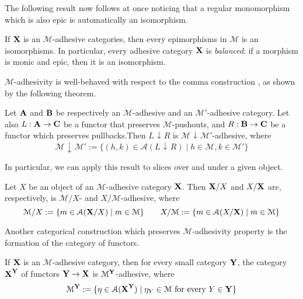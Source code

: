 \documentclass[a4paper,UKenglish,cleveref,pdftex, thm-restate,numberwithinsect]{lipics}
\def\A{\textbf {\textup{A}}}
\def\B{\textbf {\textup{B}}}
\def\C{\textbf {\textup{C}}}
\def\X{\textbf {\textup{X}}}
\def\Y{\textbf {\textup{Y}}}
\newcommand{\comma}[2]{#1\hspace{1pt} {\downarrow}\hspace{1pt} #2}
\newcommand{\cma}[2]{\mathcal{#1}\hspace{1pt} {\downarrow}\hspace{1pt} \mathcal{#2}}
\begin{document}
{The following result now follows at once noticing that a regular monomorphism which is also epic is automatically an isomorphism.

\begin{corollary}\label{prop:bal}
If $\X$ is an $\mathcal{M}$-adhesive categories, then every epimorphisms in $\mathcal{M}$ is an isomorphisms. In particular, every adhesive category $\X$ is \emph{balanced}: if a morphism is monic and epic, then it is an isomorphism.
\end{corollary}
}


$\mathcal{M}$-adhesivity is well-behaved with respect to  the comma construction \cite{mac2013categories}, as shown by the following theorem.
\begin{theorem}\label{lem:comma}
	Let $\A$ and $\B$ be respectively an $\mathcal{M}$-adhesive and an $\mathcal{M}'$-adhesive category. Let also $L:\A\rightarrow \C$ be a functor that preserves $\mathcal{M}$-pushouts, and  $R:\B\rightarrow \C$ be a functor which preserves pullbacks.Then $\comma{L}{R}$ is $\cma{M}{M'}$-adhesive, where 
	\[
	\cma{M}{M}':=\{(h,k)\in \mathcal{A}(\comma{L}{R}) \mid h\in \mathcal{M}, k\in \mathcal{M}'\}\]
\end{theorem}

In particular, we can apply this result to slices over and under a given object.

\begin{corollary}\label{cor:slice}
	Let  $X$ be an object of an $\mathcal{M}$-adhesive category $\X$. Then  $\X/X$ and $X/\X$ are, respectively, is $\mathcal{M}/X$- and $X/\mathcal{M}$-adhesive, where
	\[\mathcal{M}/X:=\{m\in  \mathcal{A}(\X/X) \mid m\in \mathcal{M} \} \qquad X/\mathcal{M}:=\{m\in  \mathcal{A}(X/\X) \mid m\in \mathcal{M} \}\]
\end{corollary}


Another categorical construction which preserves $\mathcal{M}$-adhesivity property is the formation of the category of functors.

\begin{theorem}\label{thm:functors}
If $\X$ is an $\mathcal{M}$-adhesive category, then for every small category $\Y$, the category $\X^\Y$  of functors $\Y\to \X$ is $\mathcal{M}^{\Y}$-adhesive, where
\[\mathcal{M}^{\Y}:=\{\eta \in \mathcal{A}(\X^\Y) \mid \eta_Y \in \mathcal{M} \text{ for every } Y\in \Y\}\]
\end{theorem}
\end{document}
